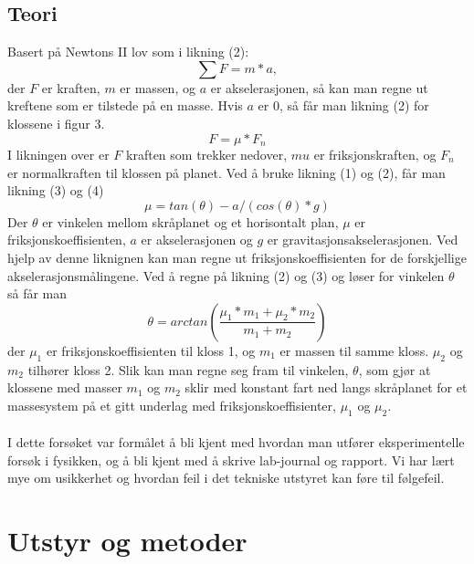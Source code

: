 \documentclass[10pt,a4paper]{report}
\begin{document}
\section*{Teori}
Basert på Newtons II lov som i likning (2): 
\begin{equation}
\sum{F} = m*a,
\end{equation} der $F$ er kraften, $m$ er massen, og $a$ er akselerasjonen, så kan man regne ut kreftene som er tilstede på en masse. Hvis $a$ er 0, så får man likning (2) for klossene i figur 3. 
\begin{equation}
F = \mu *F_n
\end{equation}
I likningen over er $F$ kraften som trekker nedover, $mu$ er friksjonskraften, og $F_n$ er normalkraften til klossen på planet.
Ved å bruke likning (1) og (2), får man likning (3) og (4)
\begin{equation}
\mu = tan(\theta)-a/(cos(\theta)*g)
\end{equation}
Der $\theta$ er vinkelen mellom skråplanet og et horisontalt plan, $\mu$ er friksjonskoeffisienten, $a$ er akselerasjonen og $g$ er gravitasjonsakselerasjonen. Ved hjelp av denne liknignen kan man regne ut friksjonskoeffisienten for de forskjellige akselerasjonsmålingene. Ved å regne på likning (2) og (3) og løser for vinkelen $\theta$ så får man
\begin{equation}
\theta = arctan(\frac{\mu_1*m_1+\mu_2*m_2}{m_1+m_2})
\end{equation}
der $\mu_1$ er friksjonskoeffisienten til kloss 1, og $m_1$ er massen til samme kloss. $\mu_2$ og $m_2$ tilhører kloss 2. Slik kan man regne seg fram til vinkelen, $\theta$, som gjør at klossene med masser $m_1$ og $m_2$ sklir med konstant fart ned langs skråplanet for et massesystem på et gitt underlag med friksjonskoeffisienter, $\mu_1$ og $\mu_2$.\\
\\I dette forsøket var formålet å bli kjent med hvordan man utfører eksperimentelle forsøk i fysikken, og å bli kjent med å skrive lab-journal og rapport. Vi har lært mye om usikkerhet og hvordan feil i det tekniske utstyret kan føre til følgefeil.

\chapter*{Utstyr og metoder}
\end{document}
